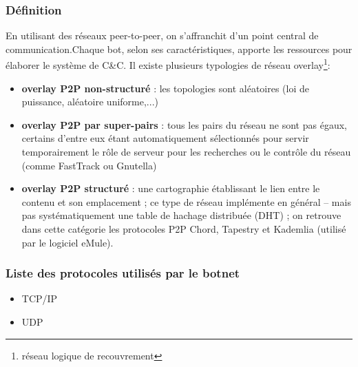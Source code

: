 
\subsubsection{Définition}
\par En utilisant des réseaux peer-to-peer, on s’affranchit d'un point central de communication.Chaque bot, selon ses caractéristiques, apporte les ressources pour élaborer le système de C\&C.
Il existe plusieurs typologies de réseau overlay\footnote{réseau logique de recouvrement}:
\begin{itemize}
	\item \textbf{overlay P2P non-structuré} : les topologies sont aléatoires (loi de puissance, aléatoire uniforme,...)
  \item \textbf{overlay P2P par super-pairs} : tous les pairs du réseau ne sont pas égaux, certains d’entre eux étant automatiquement sélectionnés pour servir temporairement le rôle de serveur pour les recherches ou le contrôle du réseau (comme FastTrack ou Gnutella)
  \item \textbf{overlay P2P structuré} : une cartographie établissant le lien entre le contenu et son emplacement ; ce type de réseau implémente en général – mais pas systématiquement une table de hachage distribuée (DHT) ; on retrouve dans cette catégorie les protocoles P2P Chord, Tapestry et Kademlia (utilisé par le logiciel eMule).
\end{itemize}

\subsubsection{Liste des protocoles utilisés par le botnet}
\begin{itemize}
	\item TCP/IP
	\item UDP
\end{itemize}

